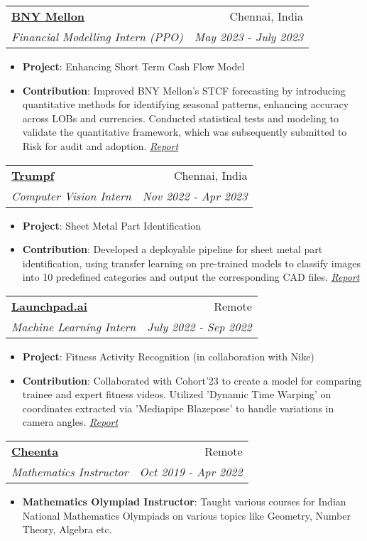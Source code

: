 \documentclass[a4paper,20pt]{article}
\makeatletter
\newcommand{\resumeItem}[2]{
  \item\small{
    \textbf{#1}{: #2 \vspace{-2pt}}
  }
}
\newcommand{\resumeSubheading}[4]{
  \vspace{-1pt}\item
    \begin{tabular*}{0.97\textwidth}{l@{\extracolsep{\fill}}r}
      \textbf{#1} & #2 \\
      \textit{#3} & \textit{#4} \\
    \end{tabular*}\vspace{-5pt}
}
\newcommand{\resumeItemListStart}{\begin{itemize}}
\newcommand{\resumeItemListEnd}{\end{itemize}\vspace{-5pt}}
\makeatother
\begin{document}
    \resumeSubheading{\href{https://www.bnymellon.com/}{BNY Mellon}}{Chennai, India}
    {Financial Modelling Intern (PPO)}{May 2023 - July 2023}
    \resumeItemListStart
        \resumeItem{Project}
          {Enhancing Short Term Cash Flow Model}
        \resumeItem{Contribution}
          {Improved BNY Mellon's STCF forecasting by introducing quantitative methods for identifying seasonal patterns, enhancing accuracy across LOBs and currencies. Conducted statistical tests and modeling to validate the quantitative framework, which was subsequently submitted to Risk for audit and adoption. \textit{\href{https://github.com/sampadk04/Internship_Reports/blob/main/BNY_Mellon/Enhancing_Short_Term_Cashflow-Internship_Report.pdf}{Report}}}
      \resumeItemListEnd

    \resumeSubheading{\href{https://www.trumpf.com/en_IN/}{Trumpf}}{Chennai, India}
    {Computer Vision Intern}{Nov 2022 - Apr 2023}
    \resumeItemListStart
        \resumeItem{Project}
          {Sheet Metal Part Identification}
        \resumeItem{Contribution}
          {Developed a deployable pipeline for sheet metal part identification, using transfer learning on pre-trained models to classify images into 10 predefined categories and output the corresponding CAD files. \textit{\href{https://github.com/sampadk04/Internship_Reports/blob/main/Trumpf_Metamation/Sheet_Metal_Part_Recognition-Internship_Report.pdf}{Report}}}
      \resumeItemListEnd

    \resumeSubheading{\href{https://www.launchpad.ai}{Launchpad.ai}}{Remote}
    {Machine Learning Intern}{July 2022 - Sep 2022}
    \resumeItemListStart
        \resumeItem{Project}
          {Fitness Activity Recognition (in collaboration with Nike)}
        \resumeItem{Contribution}
          {Collaborated with Cohort'23 to create a model for comparing trainee and expert fitness videos. Utilized 'Dynamic Time Warping' on coordinates extracted via 'Mediapipe Blazepose' to handle variations in camera angles. \textit{\href{https://github.com/sampadk04/Internship_Reports/blob/main/Launchpad/Fitness_Activity_Recognition-Final_Report.pdf}{Report}}}
      \resumeItemListEnd
    
    \resumeSubheading{\href{https://www.cheenta.com}{Cheenta}}{Remote}
    {Mathematics Instructor}{Oct 2019 - Apr 2022}
    \resumeItemListStart
        \resumeItem{Mathematics Olympiad Instructor}
          {Taught various courses for Indian National Mathematics Olympiads on various topics like Geometry, Number Theory, Algebra etc.}
      \resumeItemListEnd
    
\end{document}
